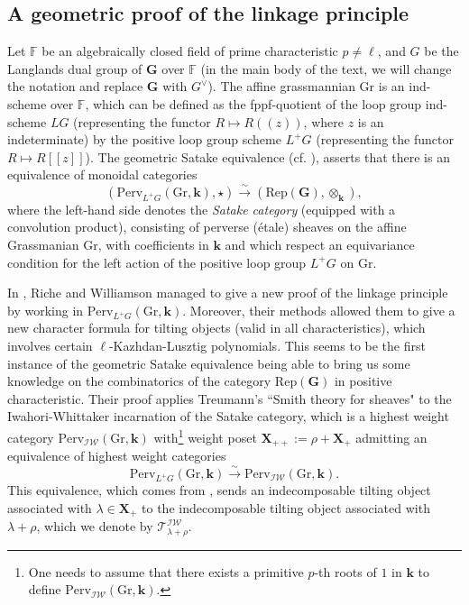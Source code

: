 \documentclass[11pt]{amsart}
\theoremstyle{plain}
\theoremstyle{remark}
\numberwithin{equation}{section}
\begin{document}
	\subsection{A geometric proof of the linkage principle}\label{A geometric proof of the linkage principle}
	Let $\mathbb{F}$ be an algebraically closed field of prime characteristic $p\neq\ell$, and $G$ be the Langlands dual group of $\mathbf{G}$ over $\mathbb{F}$ (in the main body of the text, we will change the notation and replace $\mathbf{G}$ with $G^\vee$). The affine grassmannian $\mathrm{Gr}$ is an ind-scheme over $\mathbb{F}$, which can be defined as the fppf-quotient of the loop group ind-scheme $LG$ (representing the functor $R\mapsto R((z))$, where $z$ is an indeterminate) by the positive loop group scheme $L^+G$ (representing the functor $R\mapsto R[[z]]$). The geometric Satake equivalence (cf. \cite{Mirkovic2004GeometricLD}), asserts that there is an equivalence of monoidal categories
	$$(\mathrm{Perv}_{L^+G}(\mathrm{Gr},\mathbf{k}),\star)\xrightarrow{\sim} (\mathrm{Rep}(\mathbf{G}),\otimes_\mathbf{k}),$$
	where the left-hand side denotes the \textit{Satake category} (equipped with a convolution product), consisting of perverse (\'etale) sheaves on the affine Grassmanian $\mathrm{Gr}$, with coefficients in $\mathbf{k}$ and which respect an equivariance condition for the left action of the positive loop group $L^+G$ on $\mathrm{Gr}$.
	
	In \cite{riche2020smithtreumann}, Riche and Williamson managed to give a new proof of the linkage principle by working in $\mathrm{Perv}_{L^+G}(\mathrm{Gr},\mathbf{k})$. Moreover, their methods allowed them to give a new character formula for tilting objects (valid in all characteristics), which involves certain $\ell$-Kazhdan-Lusztig polynomials. This seems to be the first instance of the geometric Satake equivalence being able to bring us some knowledge on the combinatorics of the category $\mathrm{Rep}(\mathbf{G})$ in positive characteristic. Their proof applies Treumann's ``Smith theory for sheaves" to the Iwahori-Whittaker incarnation of the Satake category, which is a highest weight category $\mathrm{Perv}_{\mathcal{IW}}(\mathrm{Gr},\mathbf{k})$ with\footnote{One needs to assume that there exists a primitive $p$-th roots of $1$ in $\mathbf{k}$  to define $\mathrm{Perv}_{\mathcal{IW}}(\mathrm{Gr},\mathbf{k})$.} weight poset $\mathbf{X}_{++}:=\rho+\mathbf{X}_+$ admitting an equivalence of highest weight categories  
	\begin{equation}\label{iwgeosat}
	    \mathrm{Perv}_{L^+G}(\mathrm{Gr},\mathbf{k})\xrightarrow{\sim} \mathrm{Perv}_{\mathcal{IW}}(\mathrm{Gr},\mathbf{k}).
	\end{equation}
	This equivalence, which comes from \cite{JEP_2019__6__707_0}, sends an indecomposable tilting object associated with $\lambda\in\mathbf{X}_+$ to the indecomposable tilting object associated with $\lambda+\rho$, which we denote by $\mathscr{T}^{\mathcal{IW}}_{\lambda+\rho}$.
	
\end{document}
